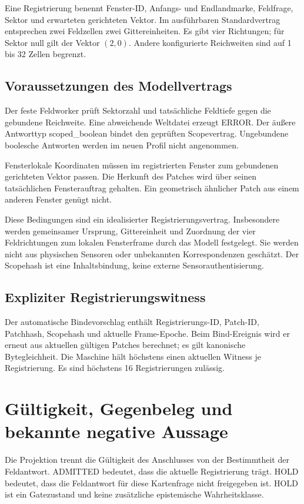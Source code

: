 \documentclass[11pt,a4paper]{article}
\newcommand{\nextsection}[2]{\clearpage{\color{accent}\small\textsf{#1}}\section{#2}}
\begin{document}
Eine Registrierung benennt Fenster-ID, Anfangs- und Endlandmarke,
Feldfrage, Sektor und erwarteten gerichteten Vektor. Im ausführbaren
Standardvertrag entsprechen zwei Feldzellen zwei Gittereinheiten.
Es gibt vier Richtungen; für Sektor null gilt der Vektor $(2,0)$.
Andere konfigurierte Reichweiten sind auf 1 bis 32 Zellen begrenzt.

\subsection{Voraussetzungen des Modellvertrags}
Der feste Feldworker prüft Sektorzahl und tatsächliche Feldtiefe
gegen die gebundene Reichweite. Eine abweichende Weltdatei erzeugt
ERROR. Der äußere Antworttyp scoped\_boolean bindet den geprüften
Scopevertrag. Ungebundene boolesche Antworten werden im neuen Profil
nicht angenommen.

Fensterlokale Koordinaten müssen im registrierten Fenster zum
gebundenen gerichteten Vektor passen. Die Herkunft des Patches
wird über seinen tatsächlichen Fensterauftrag gehalten. Ein geometrisch
ähnlicher Patch aus einem anderen Fenster genügt nicht.

Diese Bedingungen sind ein idealisierter Registrierungsvertrag.
Insbesondere werden gemeinsamer Ursprung, Gittereinheit und
Zuordnung der vier Feldrichtungen zum lokalen Fensterframe durch
das Modell festgelegt. Sie werden nicht aus physischen Sensoren
oder unbekannten Korrespondenzen geschätzt. Der Scopehash ist eine
Inhaltsbindung, keine externe Sensorauthentisierung.

\subsection{Expliziter Registrierungswitness}
Der automatische Bindevorschlag enthält Registrierungs-ID,
Patch-ID, Patchhash, Scopehash und aktuelle Frame-Epoche. Beim
Bind-Ereignis wird er erneut aus aktuellen gültigen Patches berechnet;
es gilt kanonische Bytegleichheit. Die Maschine hält höchstens einen
aktuellen Witness je Registrierung. Es sind höchstens 16 Registrierungen
zulässig.

\nextsection{43 / RELEVANZGRENZE}{Gültigkeit, Gegenbeleg und bekannte negative Aussage}
Die Projektion trennt die Gültigkeit des Anschlusses von der
Bestimmtheit der Feldantwort. ADMITTED bedeutet, dass die aktuelle
Registrierung trägt. HOLD bedeutet, dass die Feldantwort für diese
Kartenfrage nicht freigegeben ist. HOLD ist ein Gatezustand und keine
zusätzliche epistemische Wahrheitsklasse.
\end{document}
